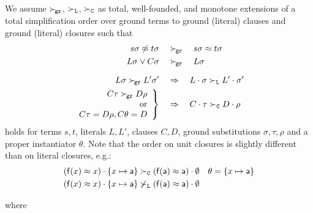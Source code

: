 \begin{definition}

    We assume $\mathrel\succ_{\!\mathtt{gr}}$, $\mathrel\succ_{\mathtt{L}}$, $\mathrel\succ_{\mathtt{C}}$ as
        total, well-founded, and monotone extensions of a
        total simplification order over ground terms to ground (literal) clauses
        and ground (literal) closures such that
        \begin{align*}
            s\sigma\not\approx t\sigma \quad&\mathrel\succ_{\!\mathtt{gr}}\quad s\sigma\approx t\sigma
            \\
            L\sigma\lor C\sigma \quad&\mathrel\succ_{\!\mathtt{gr}}\quad L\sigma
            \\[0.7em]
            L\sigma \mathrel\succ_{\!\mathtt{gr}} L'\sigma'
            \quad&\Rightarrow\quad
            L\cdot\sigma \mathrel\succ_{\mathtt{L}} L'\cdot\sigma'
        \\
        \left.
        \begin{array}{r}
            C\tau\mathrel\succ_{\!\mathtt{gr}} D\rho\\
            \text{ or}
            \\
            C\tau=D\rho, C\theta=D
        \end{array}
        \right\}
            \quad&\Rightarrow\quad
            C\cdot\tau\mathrel\succ_{\mathtt{C}} D\cdot\rho
        \end{align*}
        holds for terms $s,t$,
        literals $L, L'$,
        clauses $C,D$,
        ground substitutions $\sigma, \tau, \rho$
        and a proper instantiator $\theta$.
        Note that the order on unit closures is slightly different than on literal closures, e.g.:
        \begin{align*}
            (\mathsf{f}(x)\approx x)\cdot\{ x\mapsto \mathsf{a}\}
            &\mathrel\succ_{\mathtt{C}}
            (\mathsf{f}(\mathsf{a})\approx\mathsf{a})\cdot\emptyset
            & \theta = \{ x\mapsto \mathsf{a} \}
        \\
        (\mathsf{f}(x)\approx x)\cdot\{ x\mapsto \mathsf{a}\}
        &\not\mathrel\succ_{\mathtt{L}}
        (\mathsf{f}(\mathsf{a})\approx\mathsf{a})\cdot\emptyset
        \end{align*}



\end{definition}

\begin{definition}
    
    where
    
    \end{definition}

